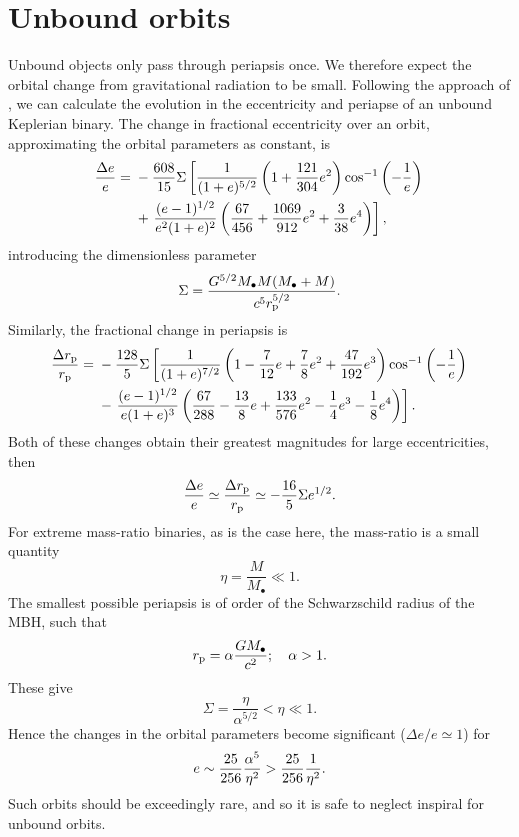 \section{Unbound orbits}\label{ap:Unbound}

Unbound objects only pass through periapsis once. We therefore expect the orbital change from gravitational radiation to be small. Following the approach of \citet{Turner1977}, we can calculate the evolution in the eccentricity and periapse of an unbound Keplerian binary. The change in fractional eccentricity over an orbit, approximating the orbital parameters as constant, is
\begin{align}
\dfrac{\Delta e}{e} = {} & -\dfrac{608}{15}\Sigma\left[\dfrac{1}{(1+e)^{5/2}}\left(1 + \dfrac{121}{304}e^2\right)\cos^{-1}\left(-\dfrac{1}{e}\right) \right. \nonumber \\*  {} & + \left. \dfrac{(e - 1)^{1/2}}{e^2(1+e)^2}\left(\dfrac{67}{456} + \dfrac{1069}{912}e^2 + \dfrac{3}{38}e^4\right)\right],
\end{align}
introducing the dimensionless parameter
\begin{equation}
\Sigma = \dfrac{G^{5/2}M_\bullet M(M_\bullet+ M)}{c^5r_\mathrm{p}^{5/2}}.
\end{equation}
Similarly, the fractional change in periapsis is
\begin{align}
\dfrac{\Delta r_\mathrm{p}}{r_\mathrm{p}} = {} & -\dfrac{128}{5}\Sigma\left[\dfrac{1}{(1+e)^{7/2}}\left(1 - \dfrac{7}{12}e + \dfrac{7}{8}e^2 + \dfrac{47}{192}e^3\right)\cos^{-1}\left(-\dfrac{1}{e}\right) \right. \nonumber \\*
 {} & - \left. \dfrac{(e - 1)^{1/2}}{e(1 + e)^3}\left(\dfrac{67}{288} - \dfrac{13}{8}e + \dfrac{133}{576}e^2 - \dfrac{1}{4}e^3 - \dfrac{1}{8}e^4\right)\right].
\end{align}
Both of these changes obtain their greatest magnitudes for large eccentricities, then
\begin{equation}
\dfrac{\Delta e}{e} \simeq \dfrac{\Delta r_\mathrm{p}}{r_\mathrm{p}} \simeq -\dfrac{16}{5}\Sigma e^{1/2}.
\end{equation}
For extreme mass-ratio binaries, as is the case here, the mass-ratio is a small quantity
\begin{equation}
\eta = \dfrac{M}{M_\bullet} \ll 1.
\end{equation}
The smallest possible periapsis is of order of the Schwarzschild radius of the MBH, such that 
\begin{equation}
r_\mathrm{p} = \alpha\dfrac{GM_\bullet}{c^2}; \quad \alpha > 1.
\end{equation}
These give
\begin{equation}
\Sigma = \dfrac{\eta}{\alpha^{5/2}} < \eta \ll 1.
\end{equation}
Hence the changes in the orbital parameters become significant ($\Delta e / e \simeq 1$) for
\begin{equation}
e \sim \dfrac{25}{256}\dfrac{\alpha^5}{\eta^2} > \dfrac{25}{256}\dfrac{1}{\eta^2}.
\end{equation}
Such orbits should be exceedingly rare, and so it is safe to neglect inspiral for unbound orbits.

